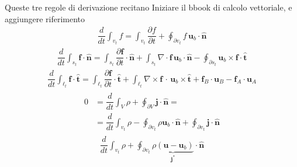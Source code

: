 \documentclass[letterpaper,10pt,english]{jupyterBook}
\begin{document}
\sphinxAtStartPar
Queste tre regole di derivazione recitano  Iniziare il bbook di calcolo vettoriale, e aggiungere riferimento
\begin{equation*}
\begin{split}\dfrac{d}{dt} \int_{v_t} f = \int_{v_t} \dfrac{\partial f}{\partial t} + \oint_{\partial v_t} f \, \mathbf{u}_b \cdot \hat{\mathbf{n}}\end{split}
\end{equation*}\begin{equation*}
\begin{split}\dfrac{d}{dt} \int_{s_t} \mathbf{f} \cdot \hat{\mathbf{n}} = \int_{s_t} \dfrac{\partial \mathbf{f}}{\partial t} \cdot \hat{\mathbf{n}} + \int_{s_t} \nabla \cdot \mathbf{f} \, \mathbf{u}_b \cdot \hat{\mathbf{n}} - \oint_{\partial s_t} \mathbf{u}_b \times \mathbf{f} \cdot \hat{\mathbf{t}}\end{split}
\end{equation*}\begin{equation*}
\begin{split}\dfrac{d}{dt} \int_{\ell_t} \mathbf{f} \cdot \hat{\mathbf{t}} = \int_{\ell_t} \dfrac{\partial \mathbf{f}}{\partial t} \cdot \hat{\mathbf{t}} + \int_{\ell_t} \nabla \times \mathbf{f} \, \cdot \, \mathbf{u}_b \times \hat{\mathbf{t}} + \mathbf{f}_B \cdot \mathbf{u}_B - \mathbf{f}_A \cdot \mathbf{u}_A\end{split}
\end{equation*}
\sphinxAtStartPar
{}
\begin{equation*}
\begin{split}\begin{aligned}
   0 & = \dfrac{d}{dt} \int_{V} \rho + \oint_{\partial V} \mathbf{j} \cdot \hat{\mathbf{n}} = \\
   & = \dfrac{d}{dt} \int_{v_t} \rho - \oint_{\partial v_t } \rho \mathbf{u}_b \cdot \hat{\mathbf{n}} + \oint_{\partial v_t} \mathbf{j} \cdot \hat{\mathbf{n}} 
\end{aligned}\end{split}
\end{equation*}\begin{equation*}
\begin{split}
    \dfrac{d}{dt} \int_{v_t} \rho + \oint_{\partial v_t} \underbrace{\rho (\mathbf{u} - \mathbf{u}_b)}_{\mathbf{j}^*} \cdot \hat{\mathbf{n}} 
\end{split}
\end{equation*}
\sphinxAtStartPar
\end{document}
